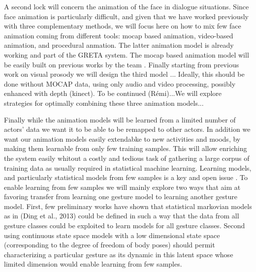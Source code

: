 A second lock will concern the animation of the face in dialogue situations. Since face animation is particularly difficult, and given that we have worked previously with three complementary methods, we will focus here on how to mix few face animation coming from different tools: mocap based animation, video-based animation, and procedural anmation. 
The latter animation model is already working and part of the GRETA system. The mocap based animation model will be easily built on previous works by the team \cite{YuThesis}. 
Finally starting from previous work on visual prosody we will design the third model ... Ideally, this should be done without MOCAP data, using only audio and video processing, possibly enhanced with depth (kinect). To be continued (Rémi)...We will explore strategies for optimally combining these three animation models...

Finally while the animation models will be learned from a limited number of actors' data we want it to be able to be remapped to other actors. 
In addition we want our animation models easily extendabke to new activities and moods, by making them learnable from only few training samples. 
This  will allow enriching the system easily whitout a costly and tedious task of gathering a large corpus of training data as usually required in statistical machine learning. Learning models, and particularly statistical models from few samples is a key and open issue \cite{One shot, Zeroshot}. 
To enable learning from few samples we will mainly explore two ways that aim at favoring transfer from learning one
gesture model to learning another gesture model. 
First, few preliminary works have shown that statistical markovian models as in (Ding et al., 2013) could be defined in such a way that the data from all gesture classes could be exploited to learn models for all gesture classes. 
Second using continuous state space models with a low dimensional state space
(corresponding to the degree of freedom of body poses) should permit characterizing a particular gesture as its dynamic
in this latent space whose limited dimension would enable learning from few samples.


